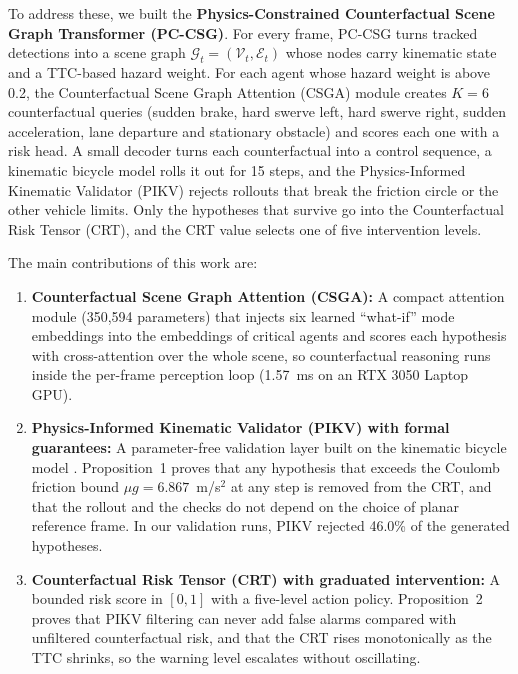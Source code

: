 \documentclass[preprint,12pt]{elsarticle}
\begin{document}
To address these, we built the \textbf{Physics-Constrained Counterfactual Scene Graph Transformer (PC-CSG)}. For every frame, PC-CSG turns tracked detections into a scene graph $\mathcal{G}_t = (\mathcal{V}_t, \mathcal{E}_t)$ whose nodes carry kinematic state and a TTC-based hazard weight. For each agent whose hazard weight is above 0.2, the Counterfactual Scene Graph Attention (CSGA) module creates $K=6$ counterfactual queries (sudden brake, hard swerve left, hard swerve right, sudden acceleration, lane departure and stationary obstacle) and scores each one with a risk head. A small decoder turns each counterfactual into a control sequence, a kinematic bicycle model rolls it out for 15 steps, and the Physics-Informed Kinematic Validator (PIKV) rejects rollouts that break the friction circle or the other vehicle limits. Only the hypotheses that survive go into the Counterfactual Risk Tensor (CRT), and the CRT value selects one of five intervention levels.

The main contributions of this work are:
\begin{enumerate}
    \item \textbf{Counterfactual Scene Graph Attention (CSGA):} A compact attention module (350,594 parameters) that injects six learned ``what-if'' mode embeddings into the embeddings of critical agents and scores each hypothesis with cross-attention over the whole scene, so counterfactual reasoning runs inside the per-frame perception loop (1.57~ms on an RTX 3050 Laptop GPU).
    \item \textbf{Physics-Informed Kinematic Validator (PIKV) with formal guarantees:} A parameter-free validation layer built on the kinematic bicycle model \cite{kong2015kinematic}. Proposition~1 proves that any hypothesis that exceeds the Coulomb friction bound $\mu g = 6.867$~m/s$^2$ at any step is removed from the CRT, and that the rollout and the checks do not depend on the choice of planar reference frame. In our validation runs, PIKV rejected 46.0\% of the generated hypotheses.
    \item \textbf{Counterfactual Risk Tensor (CRT) with graduated intervention:} A bounded risk score in $[0,1]$ with a five-level action policy. Proposition~2 proves that PIKV filtering can never add false alarms compared with unfiltered counterfactual risk, and that the CRT rises monotonically as the TTC shrinks, so the warning level escalates without oscillating.
\end{enumerate}
\end{document}
